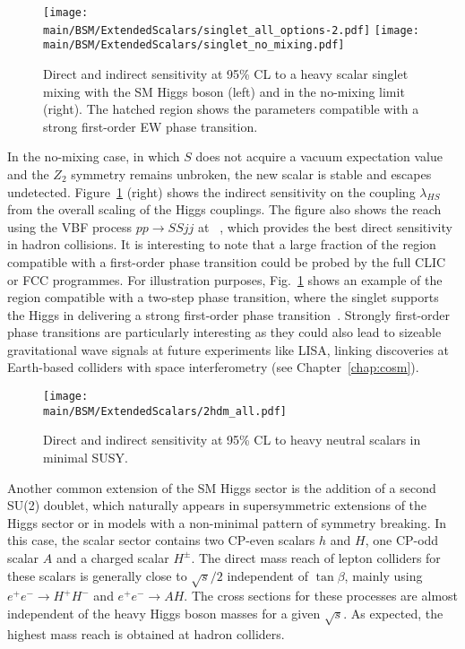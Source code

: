 \documentclass[../report.tex]{subfiles}
\providecommand{\main}{..}
\begin{document}
\begin{figure}[ht]
\centering
\texttt{[image: \\main/BSM/ExtendedScalars/singlet\_all\_options-2.pdf]}
\texttt{[image: \\main/BSM/ExtendedScalars/singlet\_no\_mixing.pdf]}
\caption{Direct and indirect sensitivity at 95\% CL to a heavy scalar singlet mixing with the SM Higgs boson (left) and in the no-mixing limit (right). The hatched region shows the parameters compatible with a strong first-order EW phase transition.}
\label{fig:singlets}
\end{figure}

In the no-mixing case, in which $S$ does not acquire a vacuum expectation value and the $Z_{2}$ symmetry remains unbroken, the new scalar is stable and escapes undetected. Figure~\ref{fig:singlets} (right) shows the indirect sensitivity on the coupling $\lambda_{HS}$ from the overall scaling of the Higgs couplings. The figure also shows the reach using the VBF process $pp \rightarrow SSjj$ at \FCChh~\cite{Curtin:2014jma}, which provides the best direct sensitivity in hadron collisions. It is interesting to note that a large fraction of the region compatible with a first-order phase transition could be probed by the full CLIC or FCC programmes. For illustration purposes, Fig.~\ref{fig:singlets} shows an example of the region compatible with a two-step phase transition, where the singlet supports the Higgs in delivering a strong first-order phase transition~\cite{Chala:2018opy}. 
Strongly first-order phase transitions are particularly interesting as they could also lead to sizeable gravitational wave signals at future experiments like LISA, linking discoveries at Earth-based colliders with space interferometry (see Chapter~\ref{chap:cosm}).

\begin{figure}[ht]
\centering
\texttt{[image: \\main/BSM/ExtendedScalars/2hdm\_all.pdf]}
\caption{Direct and indirect sensitivity at 95\% CL to heavy neutral scalars in minimal SUSY. 
}
\label{fig:2hdm}
\end{figure}

Another common extension of the SM Higgs sector is the addition of a second SU(2) doublet, which naturally appears in supersymmetric extensions of the Higgs sector or in  models with a non-minimal pattern of symmetry breaking. In this case, the scalar sector contains two CP-even scalars $h$ and $H$, one CP-odd scalar $A$ and a charged scalar $H^{\pm}$. The direct mass reach of lepton colliders for these scalars is generally close to $\sqrt{s}/2$ independent of $\tan{\beta}$, mainly using $e^{+}e^{-} \rightarrow H^{+}H^{-}$ and $e^{+}e^{-} \rightarrow AH$. The cross sections for these processes are almost independent of the heavy Higgs boson masses for a given $\sqrt{s}$. As expected, the highest mass reach is obtained at hadron colliders. 
\end{document}

